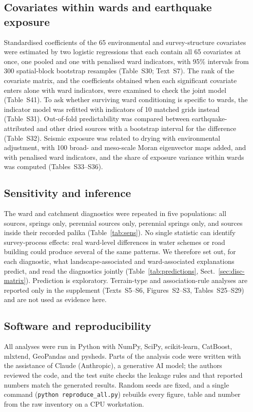 \documentclass[preprint,12pt,authoryear]{elsarticle}
\begin{document}
\subsection{Covariates within wards and earthquake exposure}
Standardised coefficients of the 65 environmental and survey-structure covariates were estimated by two logistic regressions that each contain all 65 covariates at once, one pooled and one with penalised ward indicators, with 95\% intervals from 300 spatial-block bootstrap resamples (Table~S30; Text~S7). The rank of the covariate matrix, and the coefficients obtained when each significant covariate enters alone with ward indicators, were examined to check the joint model (Table~S41). To ask whether surviving ward conditioning is specific to wards, the indicator model was refitted with indicators of 10 matched grids instead (Table~S31). Out-of-fold predictability was compared between earthquake-attributed and other dried sources with a bootstrap interval for the difference (Table~S32). Seismic exposure was related to drying with environmental adjustment, with 100 broad- and meso-scale Moran eigenvector maps added, and with penalised ward indicators, and the share of exposure variance within wards was computed (Tables~S33--S36).

\subsection{Sensitivity and inference}\label{sec:m-sens}
The ward and catchment diagnostics were repeated in five populations: all sources, springs only, perennial sources only, perennial springs only, and sources inside their recorded palika (Table~\ref{tab:sens}). No single statistic can identify survey-process effects: real ward-level differences in water schemes or road building could produce several of the same patterns. We therefore set out, for each diagnostic, what landscape-associated and ward-associated explanations predict, and read the diagnostics jointly (Table~\ref{tab:predictions}, Sect.~\ref{sec:disc-matrix}). Prediction is exploratory. Terrain-type and association-rule analyses are reported only in the supplement (Texts~S5--S6, Figures~S2--S3, Tables~S25--S29) and are not used as evidence here.

\subsection{Software and reproducibility}
All analyses were run in Python with NumPy, SciPy, scikit-learn, CatBoost, mlxtend, GeoPandas and pysheds. Parts of the analysis code were written with the assistance of Claude (Anthropic), a generative AI model; the authors reviewed the code, and the test suite checks the leakage rules and that reported numbers match the generated results. Random seeds are fixed, and a single command (\texttt{python reproduce\_all.py}) rebuilds every figure, table and number from the raw inventory on a CPU workstation.
\end{document}
